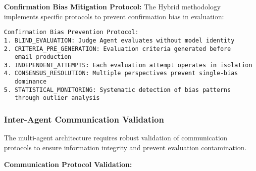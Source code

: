 \textbf{Confirmation Bias Mitigation Protocol:}
The Hybrid methodology implements specific protocols to prevent confirmation bias in evaluation:

\begin{verbatim}
Confirmation Bias Prevention Protocol:
1. BLIND_EVALUATION: Judge Agent evaluates without model identity
2. CRITERIA_PRE_GENERATION: Evaluation criteria generated before 
   email production
3. INDEPENDENT_ATTEMPTS: Each evaluation attempt operates in isolation
4. CONSENSUS_RESOLUTION: Multiple perspectives prevent single-bias 
   dominance
5. STATISTICAL_MONITORING: Systematic detection of bias patterns 
   through outlier analysis
\end{verbatim}

\subsubsection{Inter-Agent Communication Validation}

The multi-agent architecture requires robust validation of communication protocols to ensure information integrity and prevent evaluation contamination.

\textbf{Communication Protocol Validation:}

